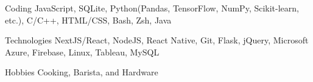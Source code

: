 

\begin{cvskills}

  \cvskill
    {Coding} %
    {JavaScript, SQLite, Python(Pandas, TensorFlow, NumPy, Scikit-learn, etc.),  C/C++, HTML/CSS, Bash, Zsh, Java} %

  \cvskill
    {Technologies} %
    {NextJS/React, NodeJS, React Native, Git, Flask, jQuery, Microsoft Azure, Firebase, Linux, Tableau, MySQL} %
    
  \cvskill
    {Hobbies} %
    {Cooking, Barista, and Hardware} %

\end{cvskills}
